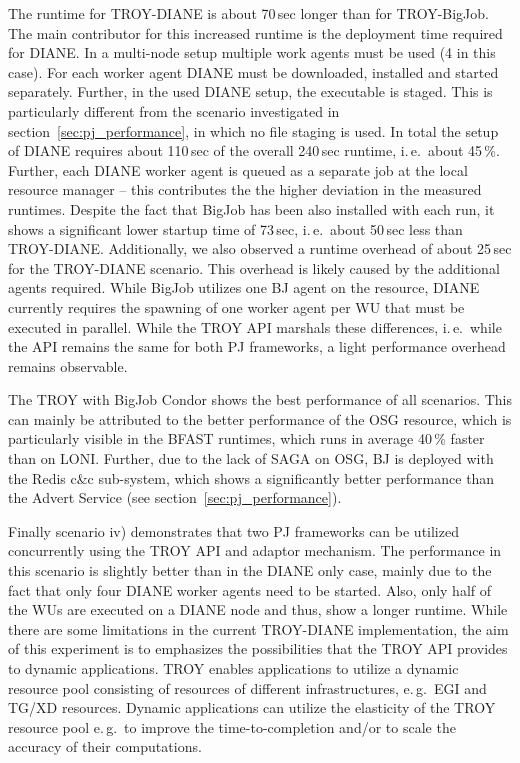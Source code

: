 \documentclass[conference,final]{IEEEtran}
\newcommand{\jhanote}[1]{ {\textcolor{red} { ***shantenu: #1 }}}
\newcommand{\alnote}[1]{ {\textcolor{blue} { ***andre: #1 }}}
\newcommand{\alnote}[1]{}
\newcommand{\jhanote}[1]{}
\begin{document}
The runtime for TROY-DIANE is about 70\,sec longer than for TROY-BigJob. The 
main contributor for this increased runtime is the deployment time required for
DIANE. In a multi-node setup multiple work agents must be used (4 in this case).
For each worker agent DIANE must be downloaded, installed and started
separately. Further, in the used DIANE setup, the executable is staged. This is
particularly different from the scenario investigated in
section~\ref{sec:pj_performance}, in which no file staging is used. In total the
setup of DIANE requires about 110\,sec of the overall 240\,sec runtime, i.\,e.\
about 45\,\%. Further, each DIANE worker agent is queued as a separate job at
the local resource manager -- this contributes the the higher deviation in the
measured runtimes. Despite the fact that BigJob has been also installed with
each run, it shows a significant lower startup time of 73\,sec, i.\,e.\ about
50\,sec less than TROY-DIANE. Additionally, we also observed a runtime overhead
of about 25\,sec for the TROY-DIANE scenario. This overhead is likely caused by
the additional agents required. While BigJob utilizes one BJ agent on the 
resource, DIANE currently requires the spawning of one worker agent per WU that 
must be executed in parallel. While the TROY API marshals these differences, 
i.\,e.\ while the API remains the same for both PJ frameworks, a light 
performance overhead remains observable.

The TROY with BigJob Condor shows the best performance of all scenarios. This
can mainly be attributed to the better performance of the OSG resource, which is
particularly visible in the BFAST runtimes, which runs in average 40\,\% faster
than on LONI. Further, due to the lack of SAGA on OSG, BJ is deployed with the
Redis c\&c sub-system, which shows a significantly better performance than the
Advert Service (see section~\ref{sec:pj_performance}).


Finally scenario iv) demonstrates that two PJ frameworks can be
utilized concurrently using the TROY API and adaptor mechanism. The performance 
in this scenario is slightly better than in the DIANE only case, mainly due to
the fact that only four DIANE worker agents need to be started. Also,
only half of the WUs are executed on a DIANE node and thus, show a
longer runtime. While there are some limitations in the current
TROY-DIANE implementation, the aim of this experiment is to emphasizes
the possibilities that the TROY API provides to dynamic
applications. TROY enables applications to utilize a dynamic resource
pool consisting of resources of different infrastructures, e.\,g.\ EGI
and TG/XD resources. Dynamic applications can utilize the elasticity
of the TROY resource pool e.\,g.\ to improve the time-to-completion
and/or to scale the accuracy of their computations.
\end{document}
